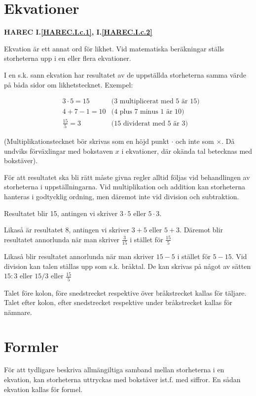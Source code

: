 \section{Ekvationer}
\textbf{HAREC I.\ref{HAREC.I.c.1}\label{myHAREC.I.c.1},
  I.\ref{HAREC.I.c.2}\label{myHAREC.I.c.2}}

Ekvation är ett annat ord för likhet. Vid matematiska beräkningar ställs
storheterna upp i en eller flera ekvationer.

I en s.k. sann ekvation har resultatet av de uppställda storheterna samma värde
på båda sidor om likhetstecknet.  Exempel:

\begin{align*}
 & 3 \cdot 5 = 15   & \text{(3 multiplicerat med 5 är 15)} \\
 & 4 + 7 - 1 = 10   & \text{(4 plus 7 minus 1 är 10)}      \\
 & \frac{15}{5} = 3 & \text{(15 dividerat med 5 är 3)}
\end{align*}

(Multiplikationstecknet bör skrivas som en höjd punkt \(\cdot\) och inte som
\(\times\).  Då undviks förväxlingar med bokstaven \(x\) i ekvationer, där
okända tal betecknas med bokstäver).

För att resultatet ska bli rätt måste givna regler alltid följas vid
behandlingen av storheterna i uppställningarna. Vid multiplikation och addition
kan storheterna hanteras i godtycklig ordning, men däremot inte vid division och
subtraktion.

Resultatet blir 15, antingen vi skriver \(3 \cdot 5\) eller \(5 \cdot
3\).

Likaså är resultatet 8, antingen vi skriver \(3 + 5\) eller \(5 + 3\).  Däremot
blir resultatet annorlunda när man skriver \(\frac{3}{15}\) i stället för
\(\frac{15}{5}\)

Likaså blir resultatet annorlunda när man skriver \(15 - 5\) i stället för \(5 -
15\). Vid division kan talen ställas upp som s.k. bråktal. De kan skrivas på
något av sätten \(15:3\) eller \(15/3\) eller \(\frac{15}{5}\)

Talet före kolon, före snedstrecket respektive över bråkstrecket kallas för
täljare.  Talet efter kolon, efter snedstrecket respektive under bråkstrecket
kallas för nämnare.

\section{Formler}

För att tydligare beskriva allmängiltiga samband mellan storheterna i en
ekvation, kan storheterna uttryckas med bokstäver ist.f. med siffror. En sådan
ekvation kallas för formel.

